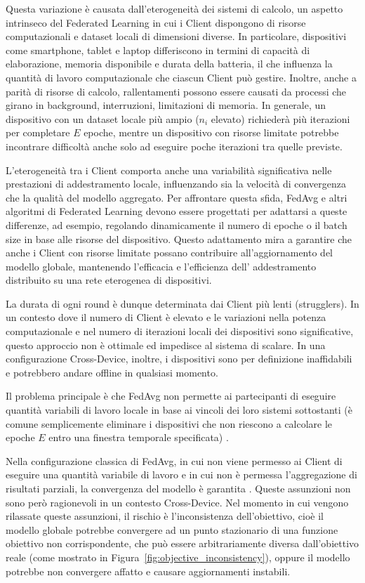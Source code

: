 \documentclass[a4paper, oneside, openright]{report}
\begin{document}
Questa variazione è causata dall'eterogeneità dei sistemi di calcolo, un aspetto intrinseco del Federated Learning in cui i Client dispongono di risorse computazionali e dataset locali di dimensioni diverse. In particolare, dispositivi come smartphone, tablet e laptop differiscono in termini di capacità di elaborazione, memoria disponibile e durata della batteria, il che influenza la quantità di lavoro computazionale che ciascun Client può gestire. Inoltre, anche a parità di risorse di calcolo, rallentamenti possono essere causati da processi che girano in background, interruzioni, limitazioni di memoria. 
In generale, un dispositivo con un dataset locale più ampio ($n_i$ elevato) richiederà più iterazioni per completare $E$ epoche, mentre un dispositivo con risorse limitate potrebbe incontrare difficoltà anche solo ad eseguire poche iterazioni tra quelle previste. 

L'eterogeneità tra i Client comporta anche una variabilità significativa nelle prestazioni di addestramento locale, influenzando sia la velocità di convergenza che la qualità del modello aggregato. Per affrontare questa sfida, FedAvg e altri algoritmi di Federated Learning devono essere progettati per adattarsi a queste differenze, ad esempio, regolando dinamicamente il numero di epoche o il batch size in base alle risorse del dispositivo. Questo adattamento mira a garantire che anche i Client con risorse limitate possano contribuire all'aggiornamento del modello globale, mantenendo l'efficacia e l'efficienza dell' addestramento distribuito su una rete eterogenea di dispositivi.

La durata di ogni round è dunque determinata dai Client più lenti (strugglers). In un contesto dove il numero di Client è elevato  e le variazioni nella potenza computazionale e nel numero di iterazioni locali dei dispositivi sono significative, questo approccio non è ottimale ed impedisce al sistema di scalare. In una configurazione Cross-Device, inoltre, i dispositivi sono per definizione inaffidabili e potrebbero andare offline in qualsiasi momento.

Il problema principale è che FedAvg non permette ai partecipanti di eseguire quantità variabili di lavoro locale in base ai vincoli dei loro sistemi sottostanti (è comune semplicemente eliminare i dispositivi che non riescono a calcolare le epoche $E$ entro una finestra temporale specificata) \cite{DBLP:journals/corr/abs-1902-01046}.

Nella configurazione classica di FedAvg, in cui non viene permesso ai Client di eseguire una quantità variabile di lavoro e in cui non è permessa l'aggregazione di risultati parziali, la convergenza del modello è garantita \cite{DBLP:journals/corr/McMahanMRA16}. Queste assunzioni non sono però ragionevoli in un contesto Cross-Device. Nel momento in cui vengono rilassate queste assunzioni, il rischio è l'inconsistenza dell'obiettivo, cioè il modello globale potrebbe convergere ad un punto stazionario di una funzione obiettivo non corrispondente, che può essere arbitrariamente diversa dall'obiettivo reale (come mostrato in Figura~\ref{fig:objective_inconsistency}), oppure il modello potrebbe non convergere affatto e causare aggiornamenti instabili.
\end{document}
